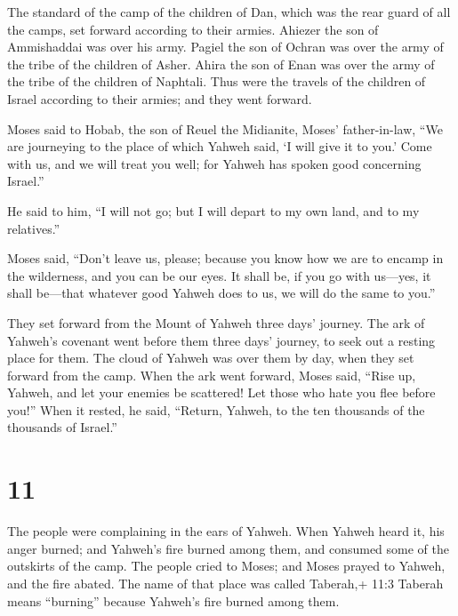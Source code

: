  The standard of the camp of the children of Dan, which was
the rear guard of all the camps, set forward according to their armies.
Ahiezer the son of Ammishaddai was over his army.  Pagiel
the son of Ochran was over the army of the tribe of the children of
Asher.  Ahira the son of Enan was over the army of the
tribe of the children of Naphtali.  Thus were the travels
of the children of Israel according to their armies; and they went
forward.

 Moses said to Hobab, the son of Reuel the Midianite,
Moses' father-in-law, ``We are journeying to the place of which Yahweh
said, `I will give it to you.' Come with us, and we will treat you well;
for Yahweh has spoken good concerning Israel.''

 He said to him, ``I will not go; but I will depart to my
own land, and to my relatives.''

 Moses said, ``Don't leave us, please; because you know how
we are to encamp in the wilderness, and you can be our eyes.
 It shall be, if you go with us---yes, it shall be---that
whatever good Yahweh does to us, we will do the same to you.''

 They set forward from the Mount of Yahweh three days'
journey. The ark of Yahweh's covenant went before them three days'
journey, to seek out a resting place for them.  The cloud
of Yahweh was over them by day, when they set forward from the camp.
 When the ark went forward, Moses said, ``Rise up, Yahweh,
and let your enemies be scattered! Let those who hate you flee before
you!''  When it rested, he said, ``Return, Yahweh, to the
ten thousands of the thousands of Israel.''

\hypertarget{section-10}{%
\section{11}\label{section-10}}

 The people were complaining in the ears of Yahweh. When
Yahweh heard it, his anger burned; and Yahweh's fire burned among them,
and consumed some of the outskirts of the camp.  The people
cried to Moses; and Moses prayed to Yahweh, and the fire abated.
 The name of that place was called Taberah,+ 11:3 Taberah
means ``burning'' because Yahweh's fire burned among them.

